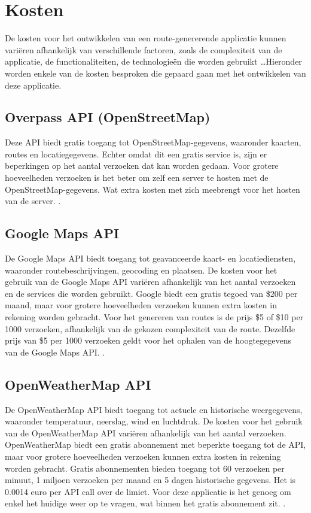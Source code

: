     \section{Kosten}

    De kosten voor het ontwikkelen van een route-genererende applicatie kunnen variëren afhankelijk van verschillende factoren, zoals de complexiteit van de applicatie, de functionaliteiten,
    de technologieën die worden gebruikt \ldots Hieronder worden enkele van de kosten besproken die gepaard gaan met het ontwikkelen van deze applicatie.

    \subsection{Overpass API (OpenStreetMap)}

    Deze API biedt gratis toegang tot OpenStreetMap-gegevens, waaronder kaarten, routes en locatiegegevens. Echter omdat dit een gratis service is,
    zijn er beperkingen op het aantal verzoeken dat kan worden gedaan. Voor grotere hoeveelheden verzoeken is het beter om zelf een server te hosten met de OpenStreetMap-gegevens.
    Wat extra kosten met zich meebrengt voor het hosten van de server. \autocite{overpass_api_docs}.


    \subsection{Google Maps API}

    De Google Maps API biedt toegang tot geavanceerde kaart- en locatiediensten, waaronder routebeschrijvingen, geocoding en plaatsen.
    De kosten voor het gebruik van de Google Maps API variëren afhankelijk van het aantal verzoeken en de services die worden gebruikt.
    Google biedt een gratis tegoed van \$200 per maand, maar voor grotere hoeveelheden verzoeken kunnen extra kosten in rekening worden gebracht.
    Voor het genereren van routes is de prijs \$5 of \$10 per 1000 verzoeken, afhankelijk van de gekozen complexiteit van de route.
    Dezelfde prijs van \$5 per 1000 verzoeken geldt voor het ophalen van de hoogtegegevens van de Google Maps API. \autocite{google_maps_api_docs}.

    \subsection{OpenWeatherMap API}

    De OpenWeatherMap API biedt toegang tot actuele en historische weergegevens, waaronder temperatuur, neerslag, wind en luchtdruk.
    De kosten voor het gebruik van de OpenWeatherMap API variëren afhankelijk van het aantal verzoeken.
    OpenWeatherMap biedt een gratis abonnement met beperkte toegang tot de API, maar voor grotere hoeveelheden verzoeken kunnen extra kosten in rekening worden gebracht.
    Gratis abonnementen bieden toegang tot 60 verzoeken per minuut, 1 miljoen verzoeken per maand en 5 dagen historische gegevens.
    Het is 0.0014 euro per API call over de limiet. Voor deze applicatie is het genoeg om enkel het huidige weer op te vragen, wat binnen het gratis abonnement zit.
    \autocite{openweathermap_api_docs}.

